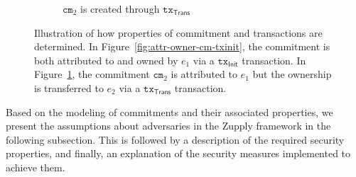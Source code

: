 \begin{figure}[h]
\begin{subfigure}[t]{0.65\textwidth}
\begin{tikzpicture}[node distance=3.5cm]
	   		\end{tikzpicture}
	   		\caption{$\texttt{cm}_2$ is created through $\texttt{tx}_\textsf{Trans}$}
	   			   		    		\label{fig:attr-owner-cm-txtrans}
	   	\end{subfigure}%
    \caption[Security properties of commitments and transactions]{Illustration of how properties of commitment and transactions are determined. In Figure~\ref{fig:attr-owner-cm-txinit}, the commitment is both attributed to and owned by $e_1$ via a $\texttt{tx}_\textsf{Init}$ transaction. In Figure~\ref{fig:attr-owner-cm-txtrans}, the commitment $\texttt{cm}_2$ is attributed to $e_1$ but the ownership is transferred to $e_2$ via a $\texttt{tx}_\textsf{Trans}$ transaction.}
    	\label{fig:attr-owner-cm}
\end{figure}

Based on the modeling of commitments and their associated properties,  we present the assumptions about adversaries in the Zupply framework in the following subsection. This is followed by a description of the required security properties, and finally, an explanation of the security measures implemented to achieve them.








